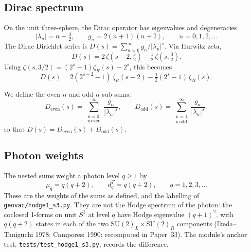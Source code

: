 \documentclass[11pt]{article}
\begin{document}
\subsection{Dirac spectrum}

On the unit three-sphere, the Dirac operator has eigenvalues and
degeneracies~\cite{camporesi1996}
\begin{equation}
  |\lambda_n| = n + \tfrac{3}{2}, \qquad
  g_n = 2(n+1)(n+2), \qquad n = 0, 1, 2, \ldots
  \label{eq:dirac_spectrum}
\end{equation}
The Dirac Dirichlet series is
$D(s) = \sum_{n=0}^{\infty} g_n / |\lambda_n|^s$.
Via Hurwitz zeta,
\begin{equation}
  D(s) = 2\,\zeta(s{-}2, \tfrac{3}{2})
       - \tfrac{1}{2}\,\zeta(s, \tfrac{3}{2}).
  \label{eq:dirac_hurwitz}
\end{equation}
Using $\zeta(s, 3/2) = (2^s - 1)\zeta_R(s) - 2^s$, this becomes
\begin{equation}
  D(s) = 2(2^{s-2} - 1)\,\zeta_R(s{-}2)
       - \tfrac{1}{2}(2^s - 1)\,\zeta_R(s).
  \label{eq:hurwitz_discriminant}
\end{equation}

We define the even-$n$ and odd-$n$ sub-sums:
\begin{equation}
  D_{\mathrm{even}}(s) = \sum_{\substack{n=0 \\ n\,\mathrm{even}}}^{\infty}
    \frac{g_n}{|\lambda_n|^s}, \qquad
  D_{\mathrm{odd}}(s) = \sum_{\substack{n=1 \\ n\,\mathrm{odd}}}^{\infty}
    \frac{g_n}{|\lambda_n|^s},
  \label{eq:D_even_odd_def}
\end{equation}
so that $D(s) = D_{\mathrm{even}}(s) + D_{\mathrm{odd}}(s)$.

\subsection{Photon weights}

The nested sums weight a photon level $q \ge 1$ by
\begin{equation}
  \mu_q = q(q+2), \qquad d_q^T = q(q+2), \qquad q = 1, 2, 3, \ldots
  \label{eq:hodge1_spectrum}
\end{equation}
These are the weights of the sums as defined, and the labelling of
\texttt{geovac/hodge1\_s3.py}.  They are not the Hodge spectrum of the
photon: the coclosed 1-forms on unit $S^3$ at level $q$ have Hodge
eigenvalue $(q+1)^2$, with $q(q+2)$ states in each of the two
$\mathrm{SU}(2)_L \times \mathrm{SU}(2)_R$ components (Ikeda--Taniguchi
1978; Camporesi 1990; recomputed in Paper~33).  The module's anchor test,
\texttt{tests/test\_hodge1\_s3.py}, records the difference.
\end{document}
